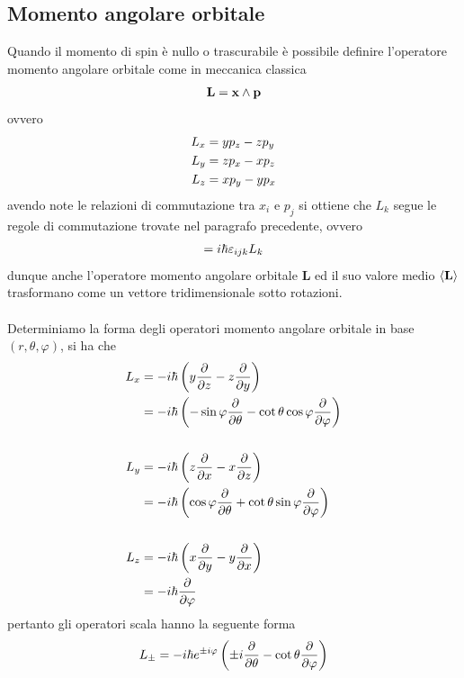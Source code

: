 \documentclass{article}
\begin{document}
\subsection{Momento angolare orbitale}
Quando il momento di spin è nullo o trascurabile è possibile definire l'operatore momento angolare orbitale come in meccanica classica
\begin{gather}
    \mathbf{L} = \mathbf{x} \wedge \mathbf{p} \notag
\end{gather}
ovvero
\begin{align}
    L_x &= yp_z - zp_y \notag \\
    L_y &= zp_x - xp_z \notag \\
    L_z &= xp_y - yp_x \notag
\end{align}
avendo note le relazioni di commutazione tra $x_i$ e $p_j$ si ottiene che $L_k$ segue le regole di commutazione trovate nel paragrafo precedente, ovvero
\begin{gather}
    [L_i, L_j] = i\hbar\varepsilon_{ijk}L_k \notag
\end{gather}
dunque anche l'operatore momento angolare orbitale $\mathbf{L}$ ed il suo valore medio $\braket{\mathbf{L}}$ trasformano come un vettore tridimensionale sotto rotazioni. \\ \\
Determiniamo la forma degli operatori momento angolare orbitale in base $(r, \theta, \varphi)$, si ha che
\begin{align}
    L_x &= -i\hbar\left( y\frac{\partial}{\partial z} - z\frac{\partial}{\partial y} \right) \notag \\
    &= -i\hbar\left( -\sin \varphi\frac{\partial}{\partial \theta} - \cot \theta \cos \varphi\frac{\partial}{\partial \varphi} \right) \notag \\ \notag \\
    L_y &= -i\hbar\left( z\frac{\partial}{\partial x} - x\frac{\partial}{\partial z} \right) \notag \\
    &= -i\hbar\left( \cos \varphi\frac{\partial}{\partial \theta} + \cot \theta \sin \varphi \frac{\partial}{\partial \varphi} \right) \notag \\ \notag \\
    L_z &= -i\hbar\left( x\frac{\partial}{\partial y} - y\frac{\partial}{\partial x} \right) \notag \\
    &= -i\hbar\frac{\partial}{\partial \varphi} \notag
\end{align}
pertanto gli operatori scala hanno la seguente forma
\begin{gather}
    L_\pm = -i\hbar e^{\pm i \varphi}\left( \pm i \frac{\partial}{\partial \theta} - \cot \theta \frac{\partial}{\partial \varphi} \right) \notag
\end{gather}
\end{document}
